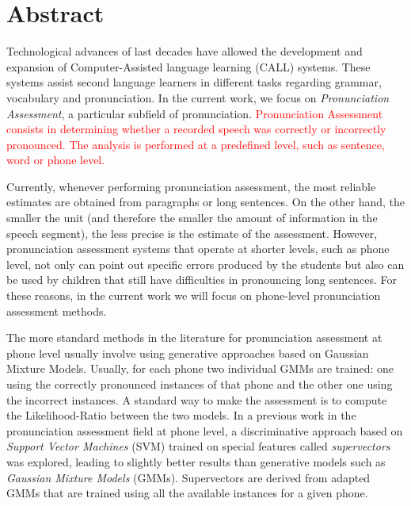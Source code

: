 \chapter*{Abstract}

\noindent
Technological advances of last decades have allowed the development and expansion
of Computer-Assisted language learning (CALL) systems. These systems assist
second language learners in different tasks regarding grammar, vocabulary and
pronunciation. In the current work, we focus on \textit{Pronunciation Assessment},
a particular subfield of pronunciation.
\textcolor{red}{
Pronunciation Assessment consists in
determining whether a recorded speech was correctly or incorrectly pronounced.
The analysis is performed at a predefined level, such as sentence, word or
phone level.
}


Currently, whenever performing pronunciation assessment, the most reliable estimates are
obtained from paragraphs or long sentences. On the other hand, the smaller the unit
(and therefore the smaller the amount of information in the speech segment),
the less precise is
the estimate of the assessment.
However, pronunciation assessment systems that operate at shorter levels, such
as phone level,
not only can point out specific errors produced by the students but also
can be used by children that still have difficulties in pronouncing long sentences.
For these reasons,
in the current work we will focus on phone-level pronunciation assessment methods.

The more standard methods in the literature for pronunciation assessment at
phone level usually involve using generative approaches
based on Gaussian Mixture Models.
Usually, for each phone two individual GMMs are trained: one using the correctly
pronounced instances of that phone and the other one using the incorrect instances.
A standard way to make the assessment is to compute the
Likelihood-Ratio between the two models.
In a previous work in the pronunciation assessment field at phone level, a discriminative
approach based on \textit{Support Vector Machines} (SVM) trained on special features
called \textit{supervectors} was explored, leading to slightly better results than
generative models such as \textit{Gaussian Mixture Models} (GMMs). Supervectors
are derived from adapted GMMs that are trained using all the available
instances for a given phone.

